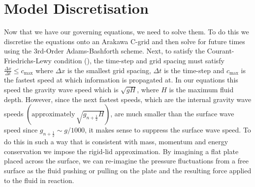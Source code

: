 \documentclass[12pt,a4paper]{report}
\newcommand*{\half}{\frac{1}{2}}
\begin{document}
\section{Model Discretisation}

Now that we have our governing equations, we need to solve them. To do this we
discretise the equations onto an Arakawa C-grid and then solve for future times
using the 3rd-Order Adams-Bashforth scheme. Next, to satisfy the Courant-Friedrichs-Lewy
 condition (\cite{courant1928partiellen}), the time-step and grid spacing must satisfy $\frac{\Delta x}{\Delta t} \leq c_{\max}$ where $\Delta x$ is the smallest grid spacing, $\Delta t$ is
 the time-step and $c_{\max}$ is the fastest speed at which information is propagated at. 
 In our equations this speed the gravity wave speed which is $\sqrt{g H}$, where $H$ is the
 maximum fluid depth. However, since the next fastest speeds, which are the internal gravity
  wave speeds $\left(\mathrm{approximately} \, \sqrt{g_{n+\half} H}\right)$, are much smaller than the surface
  wave speed since $g_{n+\half} \sim g/1000$, it makes sense to suppress the surface 
  wave speed. To do this in such a way that is consistent with mass, momentum and energy 
  conservation we impose the rigid-lid approximation. By imagining a flat plate 
  placed across the surface, we can re-imagine the pressure fluctuations from a free
  surface as the fluid pushing or pulling on the plate and the resulting force 
  applied to the fluid in reaction. 
  
\end{document}
